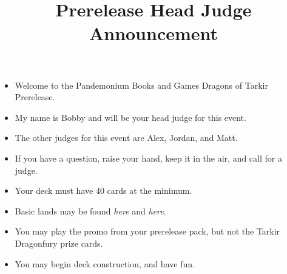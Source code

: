\documentclass{article}
\title{Prerelease Head Judge Announcement}
\date{}
\begin{document}
\maketitle
\begin{itemize}
  \item Welcome to the Pandemonium Books and Games Dragons of Tarkir Prerelease.
  \item My name is Bobby and will be your head judge for this event.
  \item The other judges for this event are Alex, Jordan, and Matt.
  \item If you have a question, raise your hand, keep it in the air,
    and call for a judge.
  \item Your deck must have 40 cards at the minimum.
  \item Basic lands may be found \emph{here} and \emph{here}.
  \item You may play the promo from your prerelease pack, but not the Tarkir
    Dragonfury prize cards.
  \item You may begin deck construction, and have fun.
\end{itemize}
\end{document}
